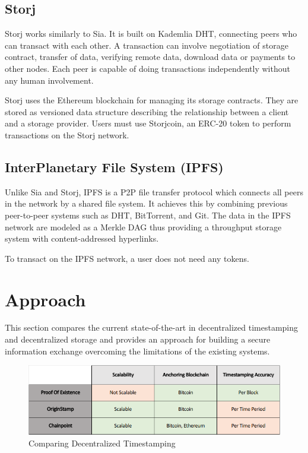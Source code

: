\documentclass[]{article}
\begin{document}
		\subsection{Storj}
			Storj\cite{wilkinson2014storj} works similarly to Sia. It is built on Kademlia\cite{maymounkov2002kademlia} DHT, connecting peers who can transact with each other. A transaction can involve negotiation of storage contract, transfer of data, verifying remote data, download data or payments to other nodes. Each peer is capable of doing transactions independently without any human involvement.
			
			Storj uses the Ethereum blockchain for managing its storage contracts. They are stored as versioned data structure describing the relationship between a client and a storage provider. Users must use Storjcoin, an ERC-20 token to perform transactions on the Storj network. 
		
		\subsection{InterPlanetary File System (IPFS)}
			Unlike Sia and Storj, IPFS\cite{benet2014ipfs} is a P2P file transfer protocol which connects all peers in the network by a shared file system. It achieves this by combining previous peer-to-peer systems such as DHT, BitTorrent, and Git. The data in the IPFS network are modeled as a Merkle\cite{merkle1980protocols} DAG thus providing a throughput storage system with content-addressed hyperlinks.
			
			To transact on the IPFS network, a user does not need any tokens.
	
	\newpage
	\section{Approach}
		This section compares the current state-of-the-art in decentralized timestamping and decentralized storage and provides an approach for building a secure information exchange overcoming the limitations of the existing systems.
		
		\begin{figure}[h]
			\includegraphics[width=\linewidth]{comparison-timestamping.png}
			\caption{Comparing Decentralized Timestamping}
			\label{fig:comparison-timestamping}
		\end{figure}
	
\end{document}
